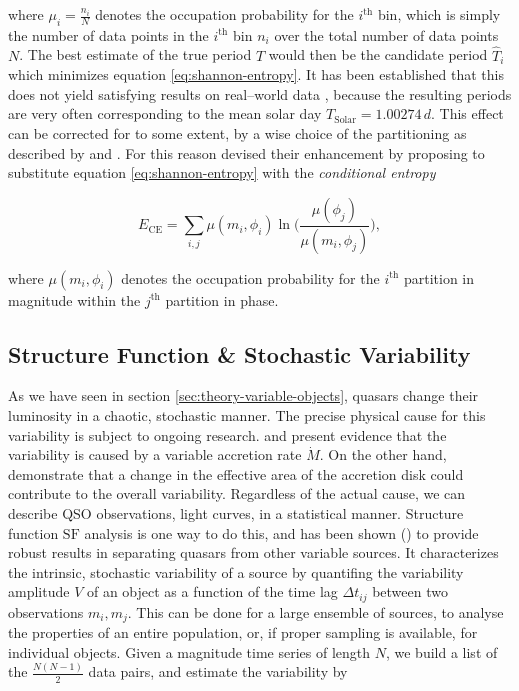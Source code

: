 where $\mu_i = \frac{n_i}{N}$ denotes the occupation probability for the $i^\text{th}$ bin, which is simply the number of data points in the $i^\text{th}$ bin $n_i$ over the total number of data points $N$. The best estimate of the true period $T$ would then be the candidate period $\hat T_i$ which minimizes equation \eqref{eq:shannon-entropy}. It has been established that this does not yield satisfying results on real--world data \citep{cincotta1999}, because the resulting periods are very often corresponding to the mean solar day $T_{\text{Solar}} = 1.00274 \, \unit{d}$. This effect can be corrected for to some extent, \eg by a wise choice of the partitioning as described by \citet{cincotta1999} and \citet{drake2013}. For this reason \citeauthor{graham2013} devised their enhancement by proposing to substitute equation \eqref{eq:shannon-entropy} with the \emph{conditional entropy}

\begin{equation}
E_\text{CE} = \sum_{i,j} \mu(m_i, \phi_i) \ln\big(\frac{\mu(\phi_j)}{\mu(m_i, \phi_j)}\big),
\end{equation}

where $\mu(m_i, \phi_i)$ denotes the occupation probability for the $i^\text{th}$ partition in magnitude within the $j^\text{th}$ partition in phase.\\


\subsection{Structure Function \& Stochastic Variability}
\label{subsec:structure-function}

As we have seen in section \ref{sec:theory-variable-objects}, quasars change their luminosity in a chaotic, stochastic manner. The precise physical cause for this variability is subject to ongoing research. \citet{pereyra2006} and \citet{li2008} present evidence that the variability is caused by a variable accretion rate $\dot M$. On the other hand, \citet{blackburne2010} demonstrate that a change in the effective area of the accretion disk could contribute to the overall variability. Regardless of the actual cause, we can describe QSO observations, \eg light curves, in a statistical manner. Structure function $\text{SF}$ analysis \citep{hughes1992,collier2001} is one way to do this, and has been shown (\eg \citet{schmidt2010}) to provide robust results in separating quasars from other variable sources. It characterizes the intrinsic, stochastic variability of a source by quantifing the variability amplitude $V$ of an object as a function of the time lag $\Delta t_{ij}$ between two observations $m_i, m_j$. This can be done for a large ensemble of sources, to analyse the properties of an entire population, or, if proper sampling is available, for individual objects. Given a magnitude time series of length $N$, we build a list of the $\frac{N(N-1)}{2}$ data pairs, and estimate the variability by

